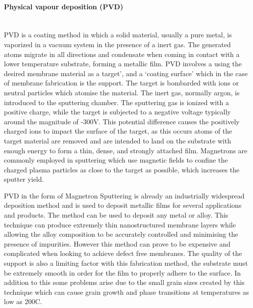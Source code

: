 \paragraph*{Physical vapour deposition (PVD)}\\

PVD is a coating method in which a solid material, usually a pure metal, is vaporized in a vacuum system in the presence of a inert gas. The generated atoms migrate in all directions and condensate when coming in contact with a lower temperature substrate,  forming a metallic film. PVD involves a using the desired membrane material as a target’, and a ‘coating surface’ which in the case of membrane fabrication is the support. \cite{Peters2015a} The target is bombarded with ions or neutral particles which atomise the material. The inert gas, normally argon, is introduced to the sputtering chamber. The sputtering gas is ionized with a positive charge, while the target is subjected to a negative voltage typically around the magnitude of -300V. This potential difference causes the positively charged ions to impact the surface of the target, as this occurs atoms of the target material are removed and are intended to land on the substrate with enough energy to form a thin, dense, and strongly attached film. Magnetrons are commonly employed in sputtering which use magnetic fields to confine the charged plasma particles as close to the target as possible, which increases the sputter yield. 

PVD in the form of Magnetron Sputtering is already an industrially widespread deposition method and is used to deposit metallic films for several applications and products. \cite{Peters2015a} The method can be used to deposit any metal or alloy. This technique can produce extremely thin nanostructured membrane layers while allowing the alloy composition to be accurately controlled and minimising the presence of impurities. \cite{Xomeritakis1997,McCool1999}  However this method can prove to be expensive and complicated when looking to achieve defect free membranes. \cite{Keurentjes2004} The quality of the support is also a limiting factor with this fabrication method, the substrate must be extremely smooth in order for the film to properly adhere to the surface.  In addition to this some problems arise due to the small grain sizes created by this technique which can cause grain growth and phase transitions at temperatures as low as 200\textdegree C. \cite{Bryden1995}


